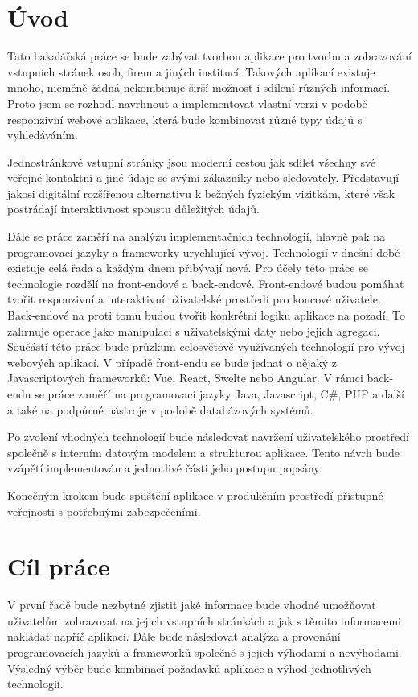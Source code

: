 \section{Úvod}

Tato bakalářská práce se bude zabývat tvorbou aplikace pro tvorbu a zobrazování vstupních stránek osob, firem a jiných
institucí.
Takových aplikací existuje mnoho, nicméně žádná nekombinuje širší možnost i sdílení různých informací.
Proto jsem se rozhodl navrhnout a implementovat vlastní verzi v podobě responzivní webové aplikace, která bude
kombinovat různé typy údajů s vyhledáváním.

Jednostránkové vstupní stránky jsou moderní cestou jak sdílet všechny své veřejné kontaktní a jiné údaje se
svými zákazníky nebo sledovately.
Představují jakosi digitální rozšířenou alternativu k bežných fyzickým vizitkám, které však postrádají interaktivnost
spoustu důležitých údajů.

Dále se práce zaměří na analýzu implementačních technologií, hlavně pak na programovací jazyky a frameworky urychlující vývoj.
Technologií v dnešní době existuje celá řada a každým dnem přibývají nové.
Pro účely této práce se technologie rozdělí na front-endové a back-endové.
Front-endové budou pomáhat tvořit responzivní a interaktivní uživatelské prostředí pro koncové uživatele.
Back-endové na proti tomu budou tvořit konkrétní logiku aplikace na pozadí.
To zahrnuje operace jako manipulaci s uživatelskými daty nebo jejich agregaci.
Součástí této práce bude průzkum celosvětově využívaných technologií pro vývoj webových aplikací.
V případě front-endu se bude jednat o nějaký z Javascriptových frameworků: Vue, React, Swelte nebo Angular.
V rámci back-endu se práce zaměří na programovací jazyky Java, Javascript, C\#, PHP a další a také na
podpůrné nástroje v podobě databázových systémů.

Po zvolení vhodných technologií bude následovat navržení uživatelského prostředí společně s interním
datovým modelem a strukturou aplikace.
Tento návrh bude vzápětí implementován a jednotlivé části jeho postupu popsány.

Konečným krokem bude spuštění aplikace v produkčním prostředí přístupné veřejnosti s potřebnými zabezpečeními.

\section{Cíl práce}

V první řadě bude nezbytné zjistit jaké informace bude vhodné umožňovat uživatelům zobrazovat na jejich
vstupních stránkách a jak s těmito informacemi nakládat napříč aplikací.
Dále bude následovat analýza a provonání programovacích jazyků a frameworků společně s jejich výhodami a nevýhodami.
Výsledný výběr bude kombinací požadavků aplikace a výhod jednotlivých technologií.

